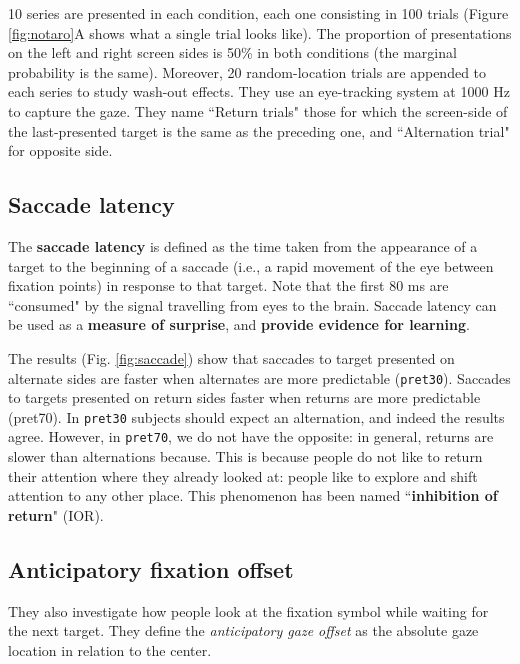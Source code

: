 10 series are presented in each condition, each one consisting in 100 trials (Figure \ref{fig:notaro}A shows what a single trial looks like).
The proportion of presentations on the left and right screen sides is 50\% in both conditions (the marginal probability is the same).
Moreover, 20 random-location trials are appended to each series to study wash-out effects. They use an eye-tracking system at 1000 Hz to capture the gaze.
They name ``Return trials" those for which the screen-side of the last-presented target is the same as the preceding one, and ``Alternation trial" for opposite side.

\subsection{Saccade latency}
The \textbf{saccade latency} is defined as the time taken from the appearance of a target to the beginning of a saccade (i.e., a rapid movement of the eye between fixation points) in response to that target. Note that the first 80 ms are ``consumed" by the signal travelling from eyes to the brain. Saccade latency can be used as a \textbf{measure of surprise}, and \textbf{provide evidence for learning}.

The results (Fig. \ref{fig:saccade}) show that saccades to target presented on alternate sides are faster when alternates are more predictable (\texttt{pret30}). Saccades to targets presented on return sides faster when returns are more predictable (pret70). In \texttt{pret30} subjects should expect an alternation, and indeed the results agree. However, in \texttt{pret70}, we do not have the opposite: in general, returns are slower than alternations because. This is because people do not like to return their attention where they already looked at: people like to explore and shift attention to any other place. This phenomenon has been named ``\textbf{inhibition of return}" (IOR).

\subsection{Anticipatory fixation offset}
They also investigate how people look at the fixation symbol while waiting for the next target.
They define the \textit{anticipatory gaze offset} as the absolute gaze location in relation to the center.

